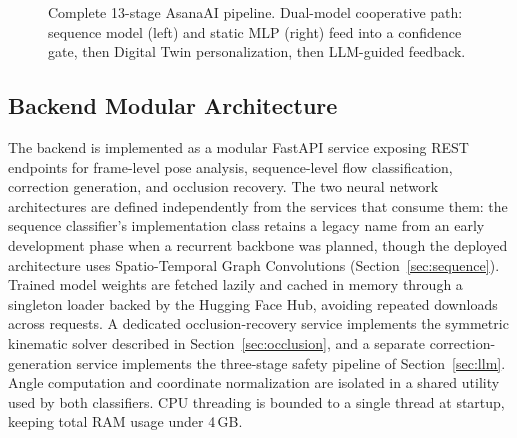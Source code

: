 \documentclass[conference]{IEEEtran}
\begin{document}
\begin{figure}[ht]
{
}
\caption{Complete 13-stage AsanaAI pipeline. Dual-model cooperative path:
sequence model (left) and static MLP (right) feed into a confidence gate,
then Digital Twin personalization, then LLM-guided feedback.}
\label{fig:pipeline}
\end{figure}

\subsection{Backend Modular Architecture}

The backend is implemented as a modular FastAPI service exposing REST endpoints for
frame-level pose analysis, sequence-level flow classification, correction generation,
and occlusion recovery. The two neural network architectures are defined independently
from the services that consume them: the sequence classifier's implementation class
retains a legacy name from an early development phase when a recurrent backbone was
planned, though the deployed architecture uses Spatio-Temporal Graph Convolutions
(Section~\ref{sec:sequence}). Trained model weights are fetched lazily and cached in
memory through a singleton loader backed by the Hugging Face Hub, avoiding repeated
downloads across requests. A dedicated occlusion-recovery service implements the
symmetric kinematic solver described in Section~\ref{sec:occlusion}, and a separate
correction-generation service implements the three-stage safety pipeline of
Section~\ref{sec:llm}. Angle computation and coordinate normalization are isolated in a
shared utility used by both classifiers. CPU threading is bounded to a single thread at
startup, keeping total RAM usage under 4\,GB.
\end{document}
